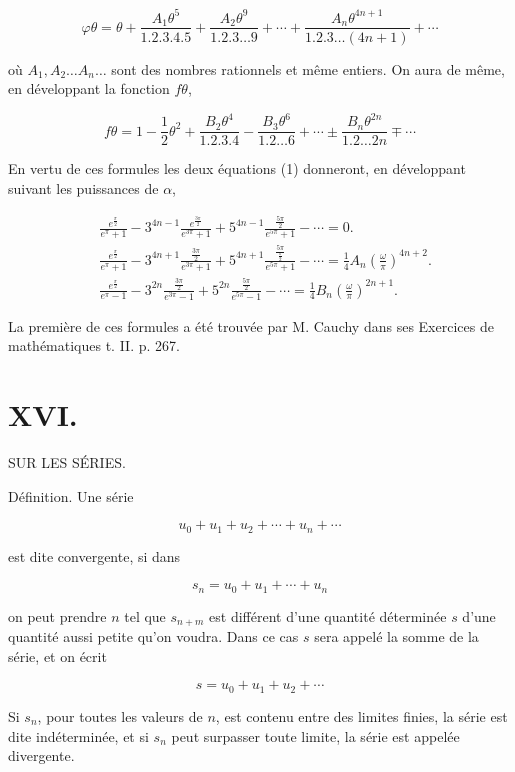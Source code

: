 \documentclass{article}
\begin{document}
\[
\varphi \theta=\theta+\frac{A_{1} \theta^{5}}{1.2 .3 .4 .5}+\frac{A_{2} \theta^{9}}{1.2 .3 \ldots 9}+\cdots+\frac{A_{n} \theta^{4 n+1}}{1.2 .3 \ldots(4 n+1)}+\cdots
\]

où \(A_{1}, A_{2} \ldots A_{n} \ldots\) sont des nombres rationnels et même entiers. On aura de même, en développant la fonction \(f \theta\),

\[
f \theta=1-\frac{1}{2} \theta^{2}+\frac{B_{2} \theta^{4}}{1.2 .3 .4}-\frac{B_{3} \theta^{6}}{1.2 \ldots 6}+\cdots \pm \frac{B_{n} \theta^{2 n}}{1.2 \ldots 2 n} \mp \cdots
\]

En vertu de ces formules les deux équations (1) donneront, en développant suivant les puissances de \(\alpha\),

\[
\begin{aligned}
& \frac{e^{\frac{\pi}{2}}}{e^{\pi}+1}-3^{4 n-1} \frac{e^{\frac{3 \pi}{2}}}{e^{3 \pi}+1}+5^{4 n-1} \frac{\frac{5 \pi}{2}}{e^{5 \pi}+1}-\cdots=0 . \\
& \frac{e^{\frac{\pi}{2}}}{e^{\pi}+1}-3^{4 n+1} \frac{\frac{3 \pi}{2}}{e^{3 \pi}+1}+5^{4 n+1} \frac{\frac{5 \pi}{\frac{\pi}{2}}}{e^{5 \pi}+1}-\cdots=\frac{1}{4} A_{n}\left(\frac{\omega}{\pi}\right)^{4 n+2} . \\
& \frac{e^{\frac{\pi}{2}}}{e^{\pi}-1}-3^{2 n} \frac{\frac{3 \pi}{2}}{e^{3 \pi}-1}+5^{2 n} \frac{\frac{5 \pi}{2}}{e^{5 \pi}-1}-\cdots=\frac{1}{4} B_{n}\left(\frac{\omega}{\pi}\right)^{2 n+1} .
\end{aligned}
\]

La première de ces formules a été trouvée par M. Cauchy dans ses Exercices de mathématiques t. II. p. 267.

\section*{XVI.}

SUR LES SÉRIES.

Définition. Une série

\[
u_{0}+u_{1}+u_{2}+\cdots+u_{n}+\cdots
\]

est dite convergente, si dans

\[
s_{n}=u_{0}+u_{1}+\cdots+u_{n}
\]

on peut prendre \(n\) tel que \(s_{n+m}\) est différent d'une quantité déterminée \(s\) d'une quantité aussi petite qu'on voudra. Dans ce cas \(s\) sera appelé la somme de la série, et on écrit

\[
s=u_{0}+u_{1}+u_{2}+\cdots
\]

Si \(s_{n}\), pour toutes les valeurs de \(n\), est contenu entre des limites finies, la série est dite indéterminée, et si \(s_{n}\) peut surpasser toute limite, la série est appelée divergente.
\end{document}
